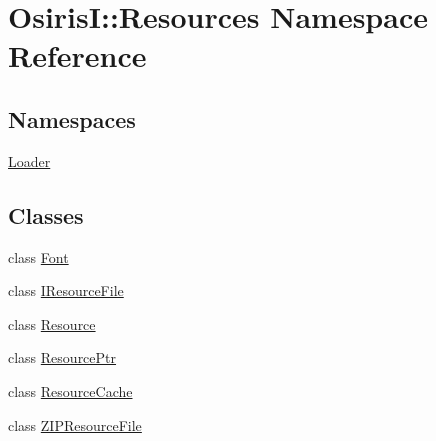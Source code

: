 \hypertarget{namespace_osiris_i_1_1_resources}{\section{Osiris\-I\-:\-:Resources Namespace Reference}
\label{namespace_osiris_i_1_1_resources}
}
\subsection*{Namespaces}
\begin{DoxyCompactItemize}
\item 
\hyperlink{namespace_osiris_i_1_1_resources_1_1_loader}{Loader}
\end{DoxyCompactItemize}
\subsection*{Classes}
\begin{DoxyCompactItemize}
\item 
class \hyperlink{class_osiris_i_1_1_resources_1_1_font}{Font}
\item 
class \hyperlink{class_osiris_i_1_1_resources_1_1_i_resource_file}{I\-Resource\-File}
\item 
class \hyperlink{class_osiris_i_1_1_resources_1_1_resource}{Resource}
\item 
class \hyperlink{class_osiris_i_1_1_resources_1_1_resource_ptr}{Resource\-Ptr}
\item 
class \hyperlink{class_osiris_i_1_1_resources_1_1_resource_cache}{Resource\-Cache}
\item 
class \hyperlink{class_osiris_i_1_1_resources_1_1_z_i_p_resource_file}{Z\-I\-P\-Resource\-File}
\end{DoxyCompactItemize}
